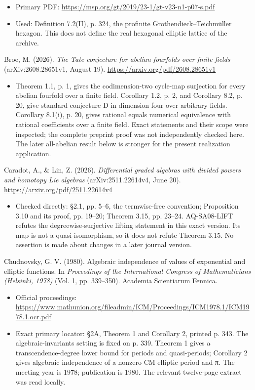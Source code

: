 \documentclass[11pt,a4paper]{article}
\providecommand{\tightlist}{\setlength{\itemsep}{0pt}\setlength{\parskip}{0pt}}
\theoremstyle{definition}\newtheorem{definition}[theorem]{Definition}
\theoremstyle{remark}\newtheorem{remark}[theorem]{Remark}
\begin{document}
\begin{itemize}
\tightlist
\item
  Primary PDF: \url{https://msp.org/gt/2019/23-1/gt-v23-n1-p07-s.pdf}
\item
  Used: Definition 7.2(II), p. 324, the profinite
  Grothendieck--Teichmüller hexagon. This does not define the real
  hexagonal elliptic lattice of the archive.
\end{itemize}

Broe, M. (2026). \emph{The Tate conjecture for abelian fourfolds over
finite fields} (arXiv:2608.28651v1, August 19).
\url{https://arxiv.org/pdf/2608.28651v1}

\begin{itemize}
\tightlist
\item
  Theorem 1.1, p. 1, gives the codimension-two cycle-map surjection for
  every abelian fourfold over a finite field. Corollary 1.2, p. 2, and
  Corollary 8.2, p. 20, give standard conjecture D in dimension four
  over arbitrary fields. Corollary 8.1(i), p. 20, gives rational equals
  numerical equivalence with rational coefficients over a finite field.
  Exact statements and their scope were inspected; the complete preprint
  proof was not independently checked here. The later all-abelian result
  below is stronger for the present realization application.
\end{itemize}

Caradot, A., \& Lin, Z. (2026). \emph{Differential graded algebras with
divided powers and homotopy Lie algebras} (arXiv:2511.22614v4, June 20).
\url{https://arxiv.org/pdf/2511.22614v4}

\begin{itemize}
\tightlist
\item
  Checked directly: §2.1, pp. 5--6, the termwise-free convention;
  Proposition 3.10 and its proof, pp. 19--20; Theorem 3.15, pp. 23--24.
  AQ-SA08-LIFT refutes the degreewise-surjective lifting statement in
  this exact version. Its map is not a quasi-isomorphism, so it does not
  refute Theorem 3.15. No assertion is made about changes in a later
  journal version.
\end{itemize}

Chudnovsky, G. V. (1980). Algebraic independence of values of
exponential and elliptic functions. In \emph{Proceedings of the
International Congress of Mathematicians (Helsinki, 1978)} (Vol. 1, pp.
339--350). Academia Scientiarum Fennica.

\begin{itemize}
\tightlist
\item
  Official proceedings:
  \url{https://www.mathunion.org/fileadmin/ICM/Proceedings/ICM1978.1/ICM1978.1.ocr.pdf}
\item
  Exact primary locator: §2A, Theorem 1 and Corollary 2, printed p. 343.
  The algebraic-invariants setting is fixed on p. 339. Theorem 1 gives a
  transcendence-degree lower bound for periods and quasi-periods;
  Corollary 2 gives algebraic independence of a nonzero CM elliptic
  period and π. The meeting year is 1978; publication is 1980. The
  relevant twelve-page extract was read locally.
\end{itemize}
\end{document}
